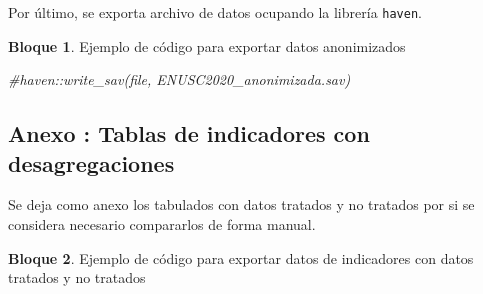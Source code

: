 \documentclass[
]{book}
\newenvironment{Shaded}{\begin{snugshade}}{\end{snugshade}}
\newcommand{\CommentTok}[1]{\textcolor[rgb]{0.56,0.35,0.01}{\textit{#1}}}
\theoremstyle{definition}
\theoremstyle{definition}
\newtheorem{example}{Bloque}[chapter]
\theoremstyle{definition}
\theoremstyle{definition}
\theoremstyle{remark}
\begin{document}
Por último, se exporta archivo de datos ocupando la librería \texttt{haven}.

\begin{example}
\protect\hypertarget{exm:bloque97nbm}{}\label{exm:bloque97nbm}Ejemplo de código para exportar datos anonimizados
\end{example}

\begin{Shaded}
\begin{Highlighting}[]
\CommentTok{\#haven::write\_sav(file, \textquotesingle{}ENUSC2020\_anonimizada.sav\textquotesingle{})}
\end{Highlighting}
\end{Shaded}

\hypertarget{anexo-tablas-de-indicadores-con-desagregaciones}{%
\subsection{Anexo : Tablas de indicadores con desagregaciones}\label{anexo-tablas-de-indicadores-con-desagregaciones}}

Se deja como anexo los tabulados con datos tratados y no tratados por si se considera necesario compararlos de forma manual.

\begin{example}
\protect\hypertarget{exm:bloque98nbm}{}\label{exm:bloque98nbm}Ejemplo de código para exportar datos de indicadores con datos tratados y no tratados
\end{example}
\end{document}
